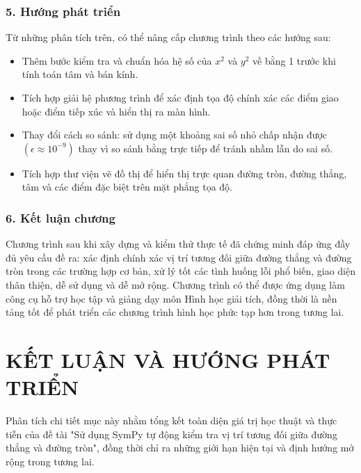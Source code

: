 \documentclass[12pt,a4paper]{article}
\begin{document}
\subsubsection*{5. Hướng phát triển}
Từ những phân tích trên, có thể nâng cấp chương trình theo các hướng sau:
\begin{itemize}
    \item Thêm bước kiểm tra và chuẩn hóa hệ số của $x^{2}$ và $y^{2}$ về bằng 1 trước khi tính toán tâm và bán kính.
    \item Tích hợp giải hệ phương trình để xác định tọa độ chính xác các điểm giao hoặc điểm tiếp xúc và hiển thị ra màn hình.
    \item Thay đổi cách so sánh: sử dụng một khoảng sai số nhỏ chấp nhận được $(\epsilon \approx 10^{-9})$ thay vì so sánh bằng trực tiếp để tránh nhầm lẫn do sai số.
    \item Tích hợp thư viện vẽ đồ thị để hiển thị trực quan đường tròn, đường thẳng, tâm và các điểm đặc biệt trên mặt phẳng tọa độ.
\end{itemize}

\subsubsection*{6. Kết luận chương}
Chương trình sau khi xây dựng và kiểm thử thực tế đã chứng minh đáp ứng đầy đủ yêu cầu đề ra: xác định chính xác vị trí tương đối giữa đường thẳng và đường tròn trong các trường hợp cơ bản, xử lý tốt các tình huống lỗi phổ biến, giao diện thân thiện, dễ sử dụng và dễ mở rộng. Chương trình có thể được ứng dụng làm công cụ hỗ trợ học tập và giảng dạy môn Hình học giải tích, đồng thời là nền tảng tốt để phát triển các chương trình hình học phức tạp hơn trong tương lai.

\pagebreak


\section{KẾT LUẬN VÀ HƯỚNG PHÁT TRIỂN}

Phân tích chi tiết mục này nhằm tổng kết toàn diện giá trị học thuật và thực tiễn của đề tài "Sử dụng SymPy tự động kiểm tra vị trí tương đối giữa đường thẳng và đường tròn", đồng thời chỉ ra những giới hạn hiện tại và định hướng mở rộng trong tương lai.
\end{document}
